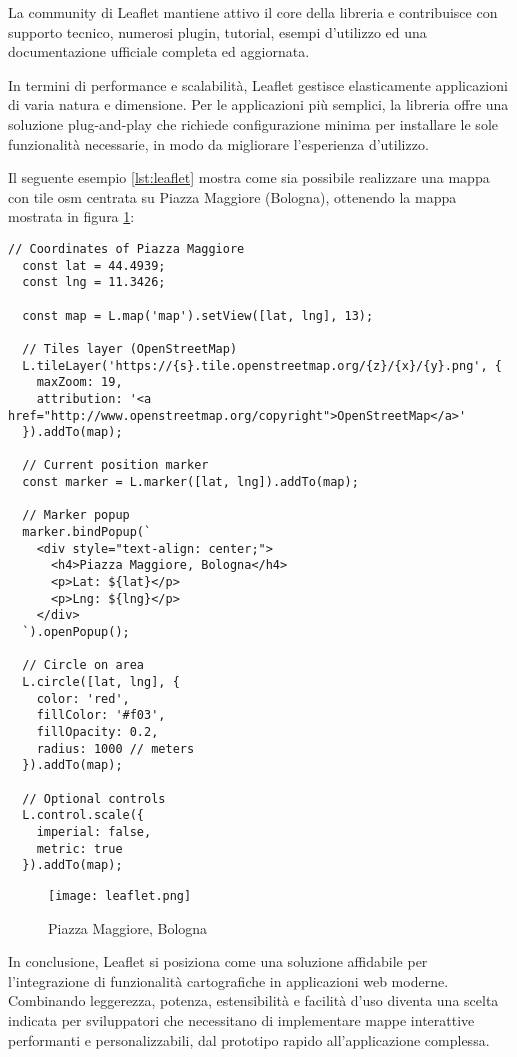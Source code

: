 La community di Leaflet mantiene attivo il core della libreria e contribuisce con supporto tecnico, numerosi plugin,
tutorial, esempi d'utilizzo ed una documentazione ufficiale completa ed aggiornata.

In termini di performance e scalabilità, Leaflet gestisce elasticamente applicazioni di varia natura e dimensione.
Per le applicazioni più semplici, la libreria offre una soluzione plug-and-play che richiede configurazione minima
per installare le sole funzionalità necessarie, in modo da migliorare l'esperienza d'utilizzo.

Il seguente esempio \ref{lst:leaflet} mostra come sia possibile realizzare una mappa con tile \acrfull{osm}
centrata su Piazza Maggiore (Bologna), ottenendo la mappa mostrata in figura \ref{fig:leaflet}:

\begin{lstlisting}[caption={Mappa Bologna con Leaflet}, label=lst:leaflet]
  // Coordinates of Piazza Maggiore
  const lat = 44.4939;
  const lng = 11.3426;

  const map = L.map('map').setView([lat, lng], 13);

  // Tiles layer (OpenStreetMap)
  L.tileLayer('https://{s}.tile.openstreetmap.org/{z}/{x}/{y}.png', {
    maxZoom: 19,
    attribution: '<a href="http://www.openstreetmap.org/copyright">OpenStreetMap</a>'
  }).addTo(map);

  // Current position marker
  const marker = L.marker([lat, lng]).addTo(map);

  // Marker popup
  marker.bindPopup(`
    <div style="text-align: center;">
      <h4>Piazza Maggiore, Bologna</h4>
      <p>Lat: ${lat}</p>
      <p>Lng: ${lng}</p>
    </div>
  `).openPopup();

  // Circle on area
  L.circle([lat, lng], {
    color: 'red',
    fillColor: '#f03',
    fillOpacity: 0.2,
    radius: 1000 // meters
  }).addTo(map);

  // Optional controls
  L.control.scale({
    imperial: false,
    metric: true
  }).addTo(map);
\end{lstlisting}

\begin{figure}[H]
  \centering
  \texttt{[image: leaflet.png]}
  \caption{Piazza Maggiore, Bologna}
  \label{fig:leaflet}
\end{figure}

In conclusione, Leaflet si posiziona come una soluzione affidabile per l'integrazione di funzionalità cartografiche
in applicazioni web moderne. Combinando leggerezza, potenza, estensibilità e facilità d'uso diventa una scelta indicata
per sviluppatori che necessitano di implementare mappe interattive performanti e personalizzabili, dal prototipo rapido
all'applicazione complessa.

